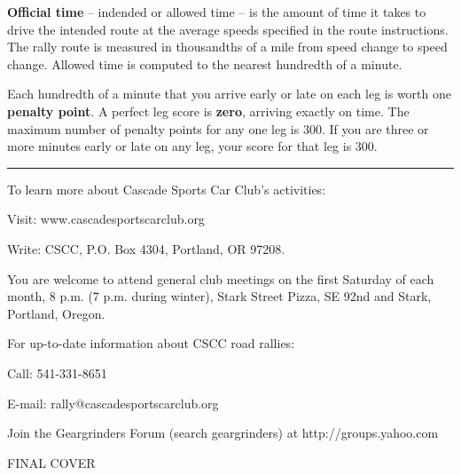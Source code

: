 \documentclass[letterpaper,9pt]{article}
\newcommand{\tinyitem}[1]{
  {\footnotesize \item #1}
}
\newcommand{\myline}{
  \par
  \kern3pt %
  \hrule height 1pt %
  \kern3pt %
}
\begin{document}
\textbf{Official time} -- indended or allowed time -- is the amount of time it takes to drive the intended route at the average speeds specified in the route instructions. The rally route is measured in thousandths of a mile from speed change to speed change. Allowed time is computed to the nearest hundredth of a minute.

Each hundredth of a minute that you arrive early or late on each leg is worth one \textbf{penalty point}. A perfect leg score is \textbf{zero}, arriving exactly on time. The maximum number of penalty points for any one leg is 300. If you are three or more minutes early or late on any leg, your score for that leg is 300.

\myline

{\small
To learn more about Cascade Sports Car Club's activities:
\begin{itemize}
  \tinyitem {Visit: www.cascadesportscarclub.org}
  \tinyitem {Write: CSCC, P.O. Box 4304, Portland, OR 97208.}
\end{itemize}

You are welcome to attend general club meetings on the first Saturday of each month, 8 p.m. (7 p.m. during winter), Stark Street Pizza, SE 92nd and Stark, Portland, Oregon.

For up-to-date information about CSCC road rallies:
\begin{itemize}
  \tinyitem {Call: 541-331-8651}
  \tinyitem {E-mail: rally@cascadesportscarclub.org}
  \tinyitem {Join the Geargrinders Forum (search geargrinders) at http://groups.yahoo.com}
\end{itemize}
}


\cleardoublepage


\tableofcontents

\cleardoublepage

\pagestyle{plain}




















\newpage

\begin{titlepage}
FINAL COVER
\end{titlepage}
\end{document}
